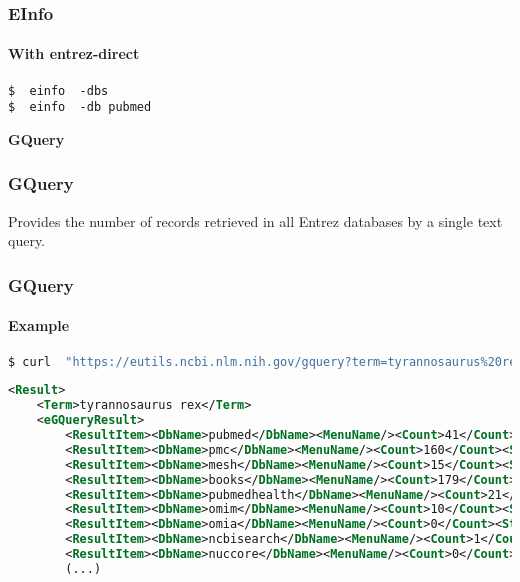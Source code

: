 \documentclass{beamer}
\newcommand{\centeredtitle}[1]{
\begin{center}
    \Huge{\bf{#1}}
\end{center}
}
\newcommand{\hugeslide}[1]{
\begin{frame}
\centeredtitle{#1}
\end{frame}
}
\begin{document}
\begin{frame}[fragile]
\frametitle{EInfo}
\framesubtitle{With entrez-direct}
\begin{lstlisting}[basicstyle=\tiny,breaklines=false]
$  einfo  -dbs
$  einfo  -db pubmed
\end{lstlisting}
\end{frame}


\hugeslide{GQuery}


\begin{frame}[fragile]
\frametitle{GQuery}
Provides the number of records retrieved in all Entrez databases by a single text query.
\end{frame}



\begin{frame}[fragile]
\frametitle{GQuery}
\framesubtitle{Example}
\begin{lstlisting}[language=bash,basicstyle=\tiny,breaklines=true,escapechar=\!]
$ curl  "https://eutils.ncbi.nlm.nih.gov/gquery?term=tyrannosaurus%20rex&retmode=xml"
\end{lstlisting}

\begin{lstlisting}[language=xml,basicstyle=\tiny,breaklines=true,escapechar=\%]
<Result>
    <Term>tyrannosaurus rex</Term>
    <eGQueryResult>
        <ResultItem><DbName>pubmed</DbName><MenuName/><Count>41</Count><Status>Ok</Status></ResultItem>
        <ResultItem><DbName>pmc</DbName><MenuName/><Count>160</Count><Status>Ok</Status></ResultItem>
        <ResultItem><DbName>mesh</DbName><MenuName/><Count>15</Count><Status>Ok</Status></ResultItem>
        <ResultItem><DbName>books</DbName><MenuName/><Count>179</Count><Status>Ok</Status></ResultItem>
        <ResultItem><DbName>pubmedhealth</DbName><MenuName/><Count>21</Count><Status>Ok</Status></ResultItem>
        <ResultItem><DbName>omim</DbName><MenuName/><Count>10</Count><Status>Ok</Status></ResultItem>
        <ResultItem><DbName>omia</DbName><MenuName/><Count>0</Count><Status>Term or Database is not found</Status></ResultItem>
        <ResultItem><DbName>ncbisearch</DbName><MenuName/><Count>1</Count><Status>Ok</Status></ResultItem>
        <ResultItem><DbName>nuccore</DbName><MenuName/><Count>0</Count><Status>Term or Database is not found</Status></ResultItem>
        (...)
\end{lstlisting}
\end{frame}
\end{document}
